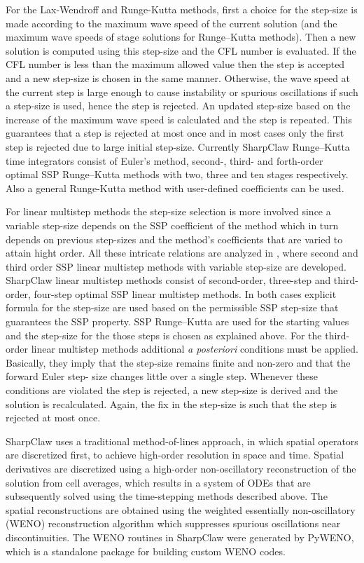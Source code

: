 For the Lax-Wendroff and Runge-Kutta methods, first a choice for the step-size
is made according to the  maximum wave speed of the current solution  (and the
maximum wave speeds of stage solutions for Runge--Kutta methods). Then a new
solution is computed using this step-size and the CFL number is evaluated. If
the CFL number is less than the maximum allowed value then the step is accepted
and a new step-size is  chosen in the same manner. Otherwise, the wave speed at
the current step is large enough to cause instability or spurious oscillations
if  such a step-size is used, hence the step is rejected. An updated step-size
based on the increase of the maximum wave speed is calculated and the step is
repeated. This guarantees that a step is rejected at most once and in most cases
only the first step is rejected due to  large initial step-size. Currently
SharpClaw Runge--Kutta time integrators consist of Euler's method, second-,
third- and forth-order optimal SSP Runge--Kutta methods with two, three and ten
stages respectively. Also a general Runge-Kutta method with user-defined
coefficients can be used.

For linear multistep methods the step-size selection is more involved since a
variable step-size depends on the SSP coefficient of the method which in turn
depends on previous step-sizes and the method's coefficients  that are varied to
attain hight order.  All these intricate relations are analyzed in , where second and third order SSP linear multistep methods with
variable step-size are developed. SharpClaw linear multistep methods consist of
second-order, three-step and third-order, four-step optimal  SSP linear
multistep methods. In both cases explicit formula for the step-size are used
based on the permissible SSP step-size that  guarantees the SSP property. SSP
Runge--Kutta are used for the starting values and the step-size for the those
steps is chosen as explained above. For the third-order linear multistep methods
additional {\em a posteriori} conditions must be applied. Basically, they imply
that the step-size remains finite and non-zero and that the forward Euler step-
size changes little over a single step. Whenever these conditions are violated
the step is rejected, a new step-size is derived and the solution is
recalculated. Again, the fix in the step-size is such that the step is rejected
at most once.

SharpClaw uses a traditional method-of-lines approach, in which
spatial operators are discretized first, to achieve high-order
resolution in space and time.  Spatial derivatives are discretized
using a high-order non-oscillatory reconstruction of the solution from
cell averages, which results in a system of ODEs that are subsequently
solved using the time-stepping methods described above.  The spatial
reconstructions are obtained using the weighted essentially
non-oscillatory (WENO) reconstruction algorithm which suppresses
spurious oscillations near discontinuities.  The WENO routines in
SharpClaw were generated by PyWENO, which is a standalone package for
building custom WENO codes. \cite{ketcheson2012pyclaw} 

